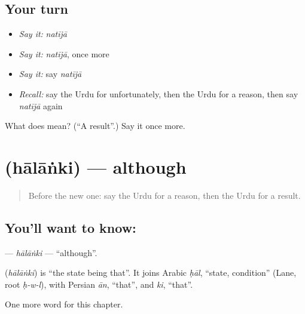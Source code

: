 \subsection*{Your turn}
\begin{itemize}
\raggedright
  \item \emph{Say it:} \emph{natījā}
  \item \emph{Say it:} \emph{natījā}, once more
  \item \emph{Say it:} say \emph{natījā}
  \item \emph{Recall:} say the Urdu for unfortunately, then the Urdu for a reason, then say \emph{natījā} again
\end{itemize}

\begin{tcolorbox}[breakable,colback=teal!4,colframe=teal!35!black,title={Before you move on}]
What does  mean? (\textquotedblleft{}A result\textquotedblright{}.) Say it once more.
\end{tcolorbox}
\section[\texorpdfstring{\ur{حالانکہ} (hālāṅki)}{حالانکہ (hālāṅki)}]{ (hālāṅki) — although}

\label{lesson:UR-C220-halanki}



\begin{quote}
Before the new one: say the Urdu for a reason, then the Urdu for a result.
\end{quote}

\subsection*{You'll want to know: }
\textbf{} — \emph{hālāṅki} — \textquotedblleft{}although\textquotedblright{}.

\begin{cousinweb}
\textbf{} (\emph{hālāṅki}) is \textquotedblleft{}the state being that\textquotedblright{}. It joins Arabic \emph{ḥāl}, \textquotedblleft{}state, condition\textquotedblright{} (Lane, root \emph{ḥ-w-l}), with Persian \emph{ān}, \textquotedblleft{}that\textquotedblright{}, and \emph{ki}, \textquotedblleft{}that\textquotedblright{}.
\end{cousinweb}

\begin{grammarlens}[title={What you've built}]
One more word for this chapter.
\end{grammarlens}

